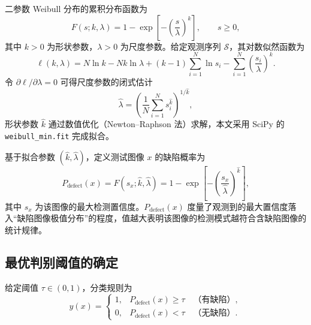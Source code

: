 二参数 Weibull 分布的累积分布函数为\cite{coles2001}
\begin{equation}
  F(s;k,\lambda) = 1-\exp\!\left[-\left(\frac{s}{\lambda}\right)^{k}\right], \qquad s\ge 0,
  \label{eq:weibull_cdf}
\end{equation}
其中 $k>0$ 为形状参数，$\lambda>0$ 为尺度参数。给定观测序列 $\mathcal{S}$，其对数似然函数为\cite{coles2001}
\begin{equation}
  \ell(k,\lambda) = N\ln k - Nk\ln\lambda + (k-1)\sum_{i=1}^{N}\ln s_i
  - \sum_{i=1}^{N}\left(\frac{s_i}{\lambda}\right)^{k}.
  \label{eq:loglik}
\end{equation}
令 $\partial\ell/\partial\lambda=0$ 可得尺度参数的闭式估计
\begin{equation}
  \hat{\lambda} = \left(\frac{1}{N}\sum_{i=1}^{N}s_i^{\hat{k}}\right)^{1/\hat{k}},
  \label{eq:lambda_hat}
\end{equation}
形状参数 $\hat{k}$ 通过数值优化（Newton--Raphson 法）求解，本文采用 SciPy 的 \texttt{weibull\_\allowbreak min.fit}\hspace{0pt} 完成拟合。

基于拟合参数 $(\hat{k},\hat{\lambda})$，定义测试图像 $x$ 的缺陷概率为
\begin{equation}
  P_{\mathrm{defect}}(x) = F(s_x;\hat{k},\hat{\lambda})
  = 1-\exp\!\left[-\left(\frac{s_x}{\hat{\lambda}}\right)^{\hat{k}}\right],
  \label{eq:defect_prob}
\end{equation}
其中 $s_x$ 为该图像的最大检测置信度。$P_{\mathrm{defect}}(x)$ 度量了观测到的最大置信度落入“缺陷图像极值分布”的程度，值越大表明该图像的检测模式越符合含缺陷图像的统计规律。

\subsection{最优判别阈值的确定}

给定阈值 $\tau\in(0,1)$，分类规则为
\begin{equation}
  \hat{y}(x) = \begin{cases}
    1, & P_{\mathrm{defect}}(x) \ge \tau \quad \text{（有缺陷）},\\
    0, & P_{\mathrm{defect}}(x) < \tau \quad \text{（无缺陷）}.
  \end{cases}
  \label{eq:class_rule}
\end{equation}

